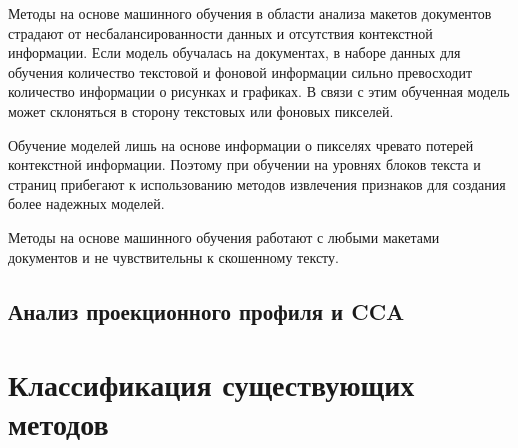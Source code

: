 Методы на основе машинного обучения в области анализа макетов документов страдают от несбалансированности данных и отсутствия контекстной информации.
Если модель обучалась на документах, в наборе данных для обучения количество текстовой и фоновой информации сильно превосходит количество информации о рисунках и графиках.
В связи с этим обученная модель может склоняться в сторону текстовых или фоновых пикселей.~\cite{dla-survey}

Обучение моделей лишь на основе информации о пикселях чревато потерей контекстной информации.
Поэтому при обучении на уровнях блоков текста и страниц прибегают к использованию методов извлечения признаков для создания более надежных моделей.~\cite{dla-survey}

Методы на основе машинного обучения работают с любыми макетами документов и не чувствительны к скошенному тексту.

\subsection{Анализ проекционного профиля и CCA}

\section{Классификация существующих методов}


